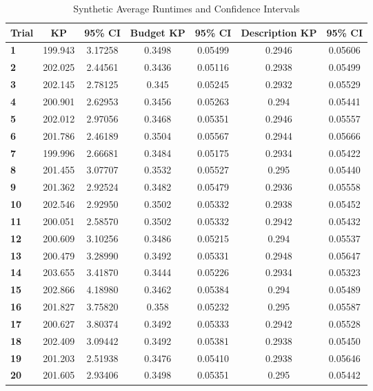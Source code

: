 \begin{table}[h!]
 \begin{center}
  \caption{Synthetic Average Runtimes and Confidence Intervals}
  \label{tab:synthetictiming}
  \begin{tabular}{l|c|c|c|c|c|c}
  \textbf{Trial} & \textbf{KP} & \textbf{95\% CI} & \textbf{Budget KP} & \textbf{95\% CI} & \textbf{Description KP} & \textbf{95\% CI}\\
  \hline
  \textbf{1} & 199.943 & 3.17258 & 0.3498 & 0.05499 & 0.2946 & 0.05606\\
  \textbf{2} & 202.025 & 2.44561 & 0.3436 & 0.05116 & 0.2938 & 0.05499\\
  \textbf{3} & 202.145 & 2.78125 & 0.345 & 0.05245 & 0.2932 & 0.05529\\
  \textbf{4} & 200.901 & 2.62953 & 0.3456 & 0.05263 & 0.294 & 0.05441\\
  \textbf{5} & 202.012 & 2.97056 & 0.3468 & 0.05351 & 0.2946 & 0.05557\\
  \textbf{6} & 201.786 & 2.46189 & 0.3504 & 0.05567 & 0.2944 & 0.05666\\
  \textbf{7} & 199.996 & 2.66681 & 0.3484 & 0.05175 & 0.2934 & 0.05422\\
  \textbf{8} & 201.455 & 3.07707 & 0.3532 & 0.05527 & 0.295 & 0.05440\\
  \textbf{9} & 201.362 & 2.92524 & 0.3482 & 0.05479 & 0.2936 & 0.05558\\
  \textbf{10} & 202.546 & 2.92950 & 0.3502 & 0.05332 & 0.2938 & 0.05452\\
  \textbf{11} & 200.051 & 2.58570 & 0.3502 & 0.05332 & 0.2942 & 0.05432\\
  \textbf{12} & 200.609 & 3.10256 & 0.3486 & 0.05215 & 0.294 & 0.05537\\
  \textbf{13} & 200.479 & 3.28990 & 0.3492 & 0.05331 & 0.2948 & 0.05647\\
  \textbf{14} & 203.655 & 3.41870 & 0.3444 & 0.05226 & 0.2934 & 0.05323\\
  \textbf{15} & 202.866 & 4.18980 & 0.3462 & 0.05384 & 0.294 & 0.05489\\
  \textbf{16} & 201.827 & 3.75820 & 0.358 & 0.05232 & 0.295 & 0.05587\\
  \textbf{17} & 200.627 & 3.80374 & 0.3492 & 0.05333 & 0.2942 & 0.05528\\
  \textbf{18} & 202.409 & 3.09442 & 0.3492 & 0.05381 & 0.2938 & 0.05450\\
  \textbf{19} & 201.203 & 2.51938 & 0.3476 & 0.05410 & 0.2938 & 0.05646\\
  \textbf{20} & 201.605 & 2.93406 & 0.3498 & 0.05351 & 0.295 & 0.05442\\
  \end{tabular}
 \end{center}
\end{table}

